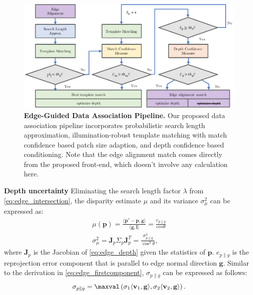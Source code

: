 \begin{figure}[t] 
  	\centering
  	\includegraphics[width=1.0\linewidth]{figures/illumination/edge_pipeline.pdf}
    \caption[Edge-Guided Data Association Pipeline]{\textbf{Edge-Guided Data Association Pipeline.} Our proposed data association pipeline incorporates probabilistic search length approximation, illumination-robust template matching with match confidence based patch size adaption, and depth confidence based conditioning. Note that the edge alignment match comes directly from the proposed front-end, which doesn't involve any calculation here.
	\label{fig:edge_pipeline}}
\end{figure}

\noindent \textbf{Depth uncertainty}
Eliminating the search length factor $\lambda$ from \ref{eq:edge_intersection}, the disparity estimate $\mu$ and its variance $\sigma_{\mu}^2$ can be expressed as:
\begin{subequations}
\begin{gather}
 \mu( \mathbf{p}) = \frac{\langle \mathbf{p}^* - \mathbf{p},  \mathbf{g} \rangle}{\langle\mathbf{g},\mathbf{l} \rangle} = \frac{e_{p \| g}}{cos \theta}  \label{eq:edge_depth} \\
\sigma_{\mu}^2 = \mathbf{J}_{p} \Sigma_{p} \mathbf{J}_{p}^T = \frac{\sigma_{p \| g}^2}{\cos^2 \theta}, \label{eq:edge_depthuncertainty} 
\end{gather}
\end{subequations}
where $\mathbf{J}_{p}$ is the Jacobian of \ref{eq:edge_depth} given the statistics of $\mathbf{p}$. $e_{p \| g}$ is the reprojection error component that is parallel to edge normal direction $\mathbf{g}$. Similar to the derivation in \ref{eq:edge_firstcomponent}, $\sigma_{p \| g}$ can be expressed as follows: 
\begin{equation} \label{eq:edge_depthlength} 
\sigma_{p \| g}  = \maxval \left( \sigma_1 \langle \mathbf{v}_1 ,
\mathbf{g} \rangle, \sigma_2 \langle \mathbf{v}_2 , \mathbf{g} \rangle \right).
\end{equation}

